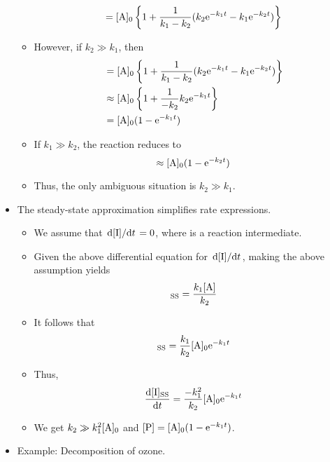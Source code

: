 \documentclass[../notes.tex]{subfiles}
\begin{document}
\begin{itemize}
\begin{itemize}
        \begin{equation*}
            [\ce{P}] = [\ce{A}]_0\left\{ 1+\frac{1}{k_1-k_2}(k_2\e[-k_1t]-k_1\e[-k_2t]) \right\}
        \end{equation*}
        \item However, if $k_2\gg k_1$, then
        \begin{align*}
            [\ce{P}] &= [\ce{A}]_0\left\{ 1+\frac{1}{k_1-k_2}(k_2\e[-k_1t]-k_1\e[-k_2t]) \right\}\\
            &\approx [\ce{A}]_0\left\{ 1+\frac{1}{-k_2}k_2\e[-k_1t] \right\}\\
            &= [\ce{A}]_0(1-\e[-k_1t])
        \end{align*}
        \item If $k_1\gg k_2$, the reaction reduces to
        \begin{equation*}
            [\ce{P}] \approx [\ce{A}]_0(1-\e[-k_2t])
        \end{equation*}
        \item Thus, the only ambiguous situation is $k_2\gg k_1$.
    \end{itemize}
    \item The steady-state approximation simplifies rate expressions.
    \begin{itemize}
        \item We assume that $\dv*{[\ce{I}]}{t}=0$, where  is a reaction intermediate.
        \item Given the above differential equation for $\dv*{[\ce{I}]}{t}$, making the above assumption yields
        \begin{equation*}
            [\ce{I}]_\text{SS} = \frac{k_1[\ce{A}]}{k_2}
        \end{equation*}
        \item It follows that
        \begin{equation*}
            [\ce{I}]_\text{SS} = \frac{k_1}{k_2}[\ce{A}]_0\e[-k_1t]
        \end{equation*}
        \item Thus,
        \begin{equation*}
            \dv{[\ce{I}]_\text{SS}}{t} = \frac{-k_1^2}{k_2}[\ce{A}]_0\e[-k_1t]
        \end{equation*}
        \item We get $k_2\gg k_1^2[\ce{A}]_0$ and $[\ce{P}]=[\ce{A}]_0(1-\e[-k_1t])$.
    \end{itemize}
    \item Example: Decomposition of ozone.

\end{itemize}
\end{document}
